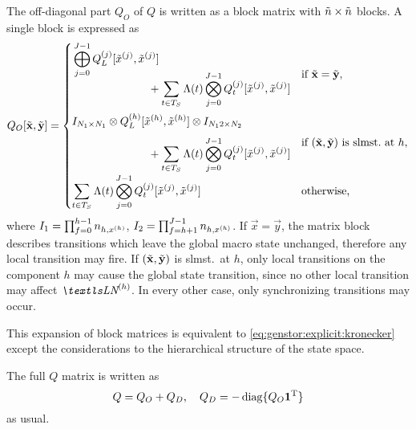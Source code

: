 The off-diagonal part $Q_O$ of $Q$ is written as a block matrix with
$\tilde{n} \times \tilde{n}$ blocks. A single block is expressed as
\begin{equation}
  \label{eq:genstor:explicit:block:block}
  Q_O[\macro{\vec{x}}, \macro{\vec{y}}] = \begin{cases}
    \begin{multlined}[c][7cm]
      \bigkrplus_{j = 0}^{J - 1}
      \loc{Q_L}{j}[\loc{\macro{x}}{j}, \loc{\macro{x}}{j}]\\[-4.5ex]
      + \sum_{t \in T_S} \Lambda(t) \bigkrtimes_{j = 0}^{J - 1}
      \loc{Q_t}{j}[\loc{\macro{x}}{j}, \loc{\macro{x}}{j}]
    \end{multlined}
    & \text{if $\macro{\vec{x}} = \macro{\vec{y}}$,} \\[6.5ex]
    \begin{multlined}[c][7cm]
      I_{N_1 \times N_1} \krtimes
      \loc{Q_L}{h}[\loc{\macro{x}}{h}, \loc{\macro{x}}{h}] \krtimes
      I_{N_12\times N_2} \\[-1.5ex]
      + \sum_{t \in T_S} \Lambda(t) \bigkrtimes_{j = 0}^{J - 1}
      \loc{Q_t}{j}[\loc{\macro{x}}{j}, \loc{\macro{x}}{j}]
    \end{multlined}
    & \text{if
      $(\macro{\vec{x}}, \macro{\vec{y}})$ is slmst.~at $h$,} \\[5ex]
    \displaystyle \sum_{t \in T_S} \Lambda(t) \bigkrtimes_{j = 0}^{J - 1}
      \loc{Q_t}{j}[\loc{\macro{x}}{j}, \loc{\macro{x}}{j}] &
      \text{otherwise,}
  \end{cases}
\end{equation}
where $I_1 = \prod_{f = 0}^{h - 1} n_{h, x^{(h)}}$, $I_2 = \prod_{f
  = h + 1}^{J - 1} n_{h, x^{(h)}}$. If $\vec{x} = \vec{y}$, the
matrix block describes transitions which leave the global macro state
unchanged, therefore any local transition may fire. If
$(\tilde{\bm{\mathrm{x}}}, \tilde{\bm{\mathrm{y}}})$ is slmst.~at $h$, only local
transitions on the component $h$ may cause the global state
transition, since no other local transition may affect $\LN{h}$. In
every other case, only synchronizing transitions may occur.

This expansion of block matrices is equivalent to
\vref{eq:genstor:explicit:kronecker} except the considerations to the
hierarchical structure of the state space.

The full $Q$ matrix is written as
\begin{equation}
  Q = Q_O + Q_D, \quad Q_D = -\operatorname{diag}\{ Q_O \bm{\mathrm{1}}^{\mathrm{T}} \}
\end{equation}
as usual.

